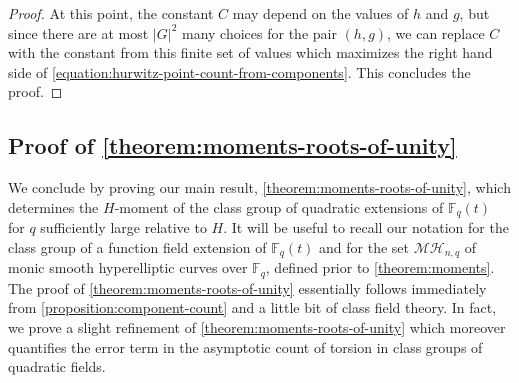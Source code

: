 \documentclass[12 pt]{amsart}
\theoremstyle{plain}
\theoremstyle{definition}
\theoremstyle{remark}
\numberwithin{equation}{section}
\begin{document}
\begin{proof}
At this point, the constant $C$ may depend on the values of $h$ and $g$, but
since there are at most $|G|^2$ many choices for the pair $(h,g)$, we can
replace $C$ with the constant from this finite set of values which maximizes the
right hand side of \eqref{equation:hurwitz-point-count-from-components}.
This concludes the proof.
\end{proof}


\subsection{Proof of \autoref{theorem:moments-roots-of-unity}}
\label{subsection:proof-moments}

We conclude by proving our main result, \autoref{theorem:moments-roots-of-unity}, which determines the $H$-moment of the
class group of quadratic extensions of $\mathbb F_q(t)$ for $q$ sufficiently
large relative to $H$.
It will be useful to recall our notation for the class group of a function field
extension of $\mathbb F_q(t)$ and for the set $\mathcal{MH}_{n,q}$ of monic
smooth hyperelliptic curves over $\mathbb F_q$,
defined prior to \autoref{theorem:moments}.
The proof of \autoref{theorem:moments-roots-of-unity} essentially follows immediately from
\autoref{proposition:component-count} and a little bit of class field theory.
In fact, we prove a slight refinement of \autoref{theorem:moments-roots-of-unity}
which moreover quantifies the error term in the asymptotic count of torsion in class groups
of quadratic fields.
\end{document}
